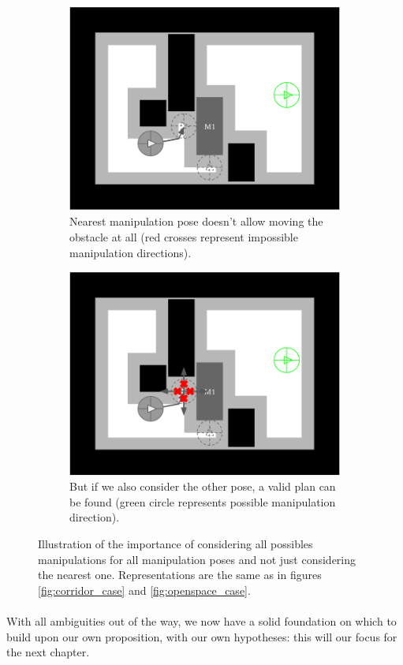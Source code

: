 \begin{figure}[H]
\centering
\begin{subfigure}{.35\textwidth}
  \centering
  \includegraphics[width=\linewidth]{Figures/Manipulation_Pose/manip_pose_1.png}
  \caption{Nearest manipulation pose doesn't allow moving the obstacle at all (red crosses represent impossible manipulation directions).}
  \label{fig:manip_pose_2}
\end{subfigure}\hspace*{\fill}
\begin{subfigure}{.35\textwidth}
  \centering
  \includegraphics[width=\linewidth]{Figures/Manipulation_Pose/manip_pose_2.png}
  \caption{But if we also consider the other pose, a valid plan can be found (green circle represents possible manipulation direction).}
  \label{fig:manip_pose_4}
\end{subfigure}
\caption{Illustration of the importance of considering all possibles manipulations for all manipulation poses and not just considering the nearest one. Representations are the same as in figures \ref{fig:corridor_case} and \ref{fig:openspace_case}.}
\label{fig:manipulation_poses}
\end{figure}

\paragraph{} With all ambiguities out of the way, we now have a solid foundation on which to build upon our own proposition, with our own hypotheses: this will our focus for the next chapter.
